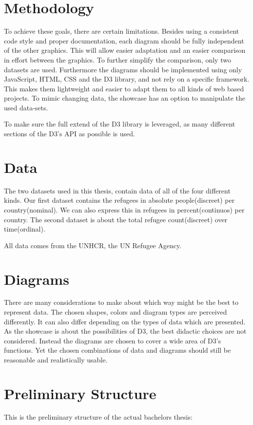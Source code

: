 \documentclass[
a4paper,     %
12pt         %
]{scrartcl}  %
\begin{document}
\section{Methodology}
To achieve these goals, there are certain limitations. Besides using a consistent code style and proper documentation, each diagram should be fully independent of the other graphics. This will allow easier adaptation and an easier comparison in effort between the graphics. To further simplify the comparison, only two datasets are used. Furthermore the diagrams should be implemented using only JavaScript, HTML, CSS and the D3 library, and not rely on a specific framework. This makes them lightweight and easier to adapt them to all kinds of web based projects. To mimic changing data, the showcase has an option to manipulate the used data-sets.

To make sure the full extend of the D3 library is leveraged, as many different sections of the D3's API\cite{d3_api} as possible is used.

\section{Data}
The two datasets used in this thesis, contain data of all of the four different kinds. Our first dataset contains the refugees in absolute people(discreet) per country(nominal). We can also express this in refugees in percent(continuos) per country. The second dataset is about the total refugee count(discreet) over time(ordinal).

All data comes from the UNHCR, the UN Refugee Agency\cite{unhcr}.

\section{Diagrams}
There are many considerations to make about which way might be the best to represent data. The chosen shapes, colors and diagram types\cite{heer2010crowdsourcing} are perceived differently. It can also differ depending on the types of data which are presented\cite{mackinlay1986automating}. As the showcase is about the possibilities of D3, the best didactic choices are not considered. Instead the diagrams are chosen to cover a wide area of D3's functions. Yet the chosen combinations of data and diagrams should still be reasonable and realistically usable.


\section{Preliminary Structure}
This is the preliminary structure of the actual bachelors thesis:
\end{document}
